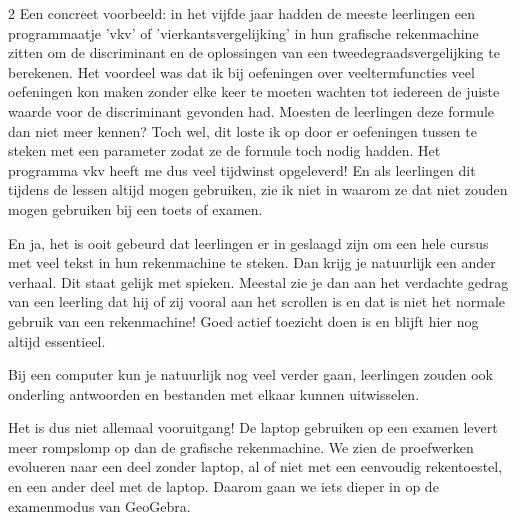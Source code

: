 \begin{multicols}{2}
Een concreet voorbeeld: in het vijfde jaar hadden de meeste leerlingen een programmaatje 'vkv' of 'vierkantsvergelijking' in hun grafische rekenmachine zitten om de discriminant en de oplossingen van een tweedegraadsvergelijking te berekenen. Het voordeel was dat ik bij oefeningen over veeltermfuncties veel oefeningen kon maken zonder elke keer te moeten wachten tot iedereen de juiste waarde voor de discriminant gevonden had. Moesten de leerlingen deze formule dan niet meer kennen? Toch wel, dit loste ik op door er oefeningen tussen te steken met een parameter zodat ze de formule toch nodig hadden. Het programma vkv heeft me dus veel tijdwinst opgeleverd! En als leerlingen dit tijdens de lessen altijd mogen gebruiken, zie ik niet in waarom ze dat niet zouden mogen gebruiken bij een toets of examen. 

En ja, het is ooit gebeurd dat leerlingen er in geslaagd zijn om een hele cursus met veel tekst in hun rekenmachine te steken. Dan krijg je natuurlijk een ander verhaal. Dit staat gelijk met spieken. Meestal zie je dan aan het verdachte gedrag van een leerling dat hij of zij vooral aan het scrollen is en dat is niet het normale gebruik van een rekenmachine! Goed actief toezicht doen is en blijft hier nog altijd essentieel. 

Bij een computer kun je natuurlijk nog veel verder gaan, leerlingen zouden ook onderling antwoorden en bestanden met elkaar kunnen uitwisselen. 

Het is dus niet allemaal vooruitgang! De laptop gebruiken op een examen levert meer rompslomp op dan de grafische rekenmachine. We zien de proefwerken evolueren naar een deel zonder laptop, al of niet met een eenvoudig rekentoestel, en een ander deel met de laptop. Daarom gaan we iets dieper in op de examenmodus van GeoGebra.  

\end{multicols}
